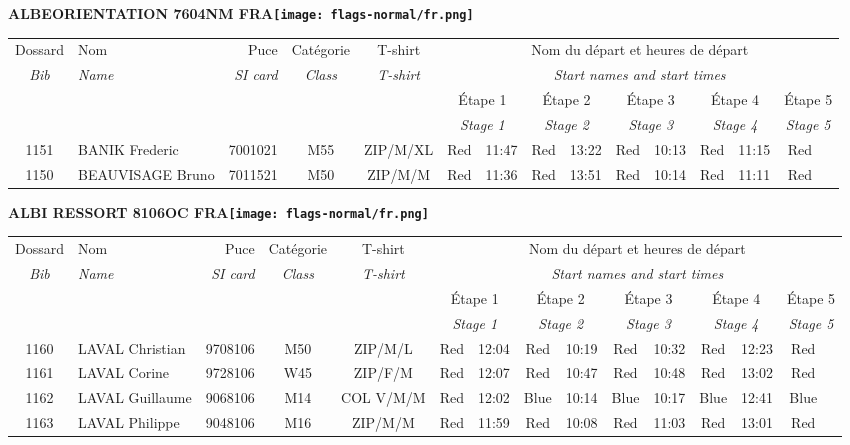\documentclass{report}
\begin{document}
\newpage
  \Huge \centering \bfseries ALBEORIENTATION 7604NM FRA\normalfont \footnotesize \sffamily \hfill \texttt{[image: flags-normal/fr.png]} \newline 
  \begin{longtable}{|c|l|r|c|c|*{5}{cc|}}
    Dossard & Nom  & Puce    & Catégorie & T-shirt & \multicolumn{10}{c|}{Nom du départ et heures de départ} \\
    \itshape Bib     & \itshape Name & \itshape SI card & \itshape Class  & \itshape  T-shirt  & \multicolumn{10}{c|}{\itshape Start names and start times} \\
    \hline
    & & & & & \multicolumn{2}{c|}{Étape 1} & \multicolumn{2}{c|}{Étape 2} & \multicolumn{2}{c|}{Étape 3} & \multicolumn{2}{c|}{Étape 4} & \multicolumn{2}{c|}{Étape 5} \\
    & & & & & \multicolumn{2}{c|}{\itshape Stage 1} & \multicolumn{2}{c|}{\itshape Stage 2} & \multicolumn{2}{c|}{\itshape Stage 3} & \multicolumn{2}{c|}{\itshape Stage 4} & \multicolumn{2}{c|}{\itshape Stage 5} \\
    \hline
    1151 & BANIK Frederic & 7001021 & M55 & ZIP/M/XL & Red & 11:47 & Red & 13:22 & Red & 10:13 & Red & 11:15 & Red &  \\
    1150 & BEAUVISAGE Bruno & 7011521 & M50 & ZIP/M/M & Red & 11:36 & Red & 13:51 & Red & 10:14 & Red & 11:11 & Red &  \\
  \end{longtable}
\newpage
  \Huge \centering \bfseries ALBI RESSORT 8106OC FRA\normalfont \footnotesize \sffamily \hfill \texttt{[image: flags-normal/fr.png]} \newline 
  \begin{longtable}{|c|l|r|c|c|*{5}{cc|}}
    Dossard & Nom  & Puce    & Catégorie & T-shirt & \multicolumn{10}{c|}{Nom du départ et heures de départ} \\
    \itshape Bib     & \itshape Name & \itshape SI card & \itshape Class  & \itshape  T-shirt  & \multicolumn{10}{c|}{\itshape Start names and start times} \\
    \hline
    & & & & & \multicolumn{2}{c|}{Étape 1} & \multicolumn{2}{c|}{Étape 2} & \multicolumn{2}{c|}{Étape 3} & \multicolumn{2}{c|}{Étape 4} & \multicolumn{2}{c|}{Étape 5} \\
    & & & & & \multicolumn{2}{c|}{\itshape Stage 1} & \multicolumn{2}{c|}{\itshape Stage 2} & \multicolumn{2}{c|}{\itshape Stage 3} & \multicolumn{2}{c|}{\itshape Stage 4} & \multicolumn{2}{c|}{\itshape Stage 5} \\
    \hline
    1160 & LAVAL Christian & 9708106 & M50 & ZIP/M/L & Red & 12:04 & Red & 10:19 & Red & 10:32 & Red & 12:23 & Red &  \\
    1161 & LAVAL Corine & 9728106 & W45 & ZIP/F/M & Red & 12:07 & Red & 10:47 & Red & 10:48 & Red & 13:02 & Red &  \\
    1162 & LAVAL Guillaume & 9068106 & M14 & COL V/M/M & Red & 12:02 & Blue & 10:14 & Blue & 10:17 & Blue & 12:41 & Blue &  \\
    1163 & LAVAL Philippe & 9048106 & M16 & ZIP/M/M & Red & 11:59 & Red & 10:08 & Red & 11:03 & Red & 13:01 & Red &  \\
  \end{longtable}
\end{document}
